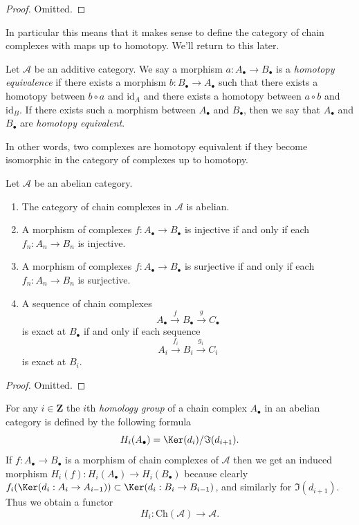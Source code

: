\begin{proof}
Omitted.
\end{proof}

\noindent
In particular this means that it makes sense to define
the category of chain complexes with maps up to homotopy.
We'll return to this later.

\begin{definition}
\label{definition-homotopy-equivalent}
Let $\mathcal{A}$ be an additive category.
We say a morphism $a : A_\bullet \to B_\bullet$
is a {\it homotopy equivalence} if there exists
a morphism $b : B_\bullet \to A_\bullet$
such that there exists a homotopy between
$b \circ a$ and $\text{id}_A$
and there exists a homotopy between $a \circ b$ and $\text{id}_B$.
If there exists such a morphism between $A_\bullet$ and $B_\bullet$, then
we say that $A_\bullet$ and $B_\bullet$ are {\it homotopy equivalent}.
\end{definition}

\noindent
In other words, two complexes are homotopy equivalent if they become
isomorphic in the category of complexes up to homotopy.

\begin{lemma}
\label{lemma-cat-chain-abelian}
Let $\mathcal{A}$ be an abelian category.
\begin{enumerate}
\item The category of chain complexes in $\mathcal{A}$ is
abelian.
\item A morphism of complexes
$f : A_\bullet \to B_\bullet$ is injective
if and only if each $f_n : A_n \to B_n$ is injective.
\item A morphism of complexes
$f : A_\bullet \to B_\bullet$ is surjective
if and only if each $f_n : A_n \to B_n$ is surjective.
\item A sequence of chain complexes
$$
A_\bullet \xrightarrow{f} B_\bullet \xrightarrow{g} C_\bullet
$$
is exact at $B_\bullet$ if and only if each sequence
$$
A_i \xrightarrow{f_i} B_i \xrightarrow{g_i} C_i
$$
is exact at $B_i$.
\end{enumerate}
\end{lemma}

\begin{proof}
Omitted.
\end{proof}

\noindent
For any $i \in \mathbf{Z}$ the $i$th {\it homology group}
of a chain complex $A_\bullet$ in an abelian category is defined by
the following formula
$$
H_i(A_\bullet) = \Ker(d_i)/\Im(d_{i + 1}).
$$
If $f : A_\bullet \to B_\bullet$ is a morphism of chain
complexes of $\mathcal{A}$ then we get an induced
morphism $H_i(f) : H_i(A_\bullet) \to H_i(B_\bullet)$
because clearly
$f_i(\Ker(d_i : A_i \to A_{i - 1})) \subset
\Ker(d_i : B_i \to B_{i - 1})$, and similarly
for $\Im(d_{i + 1})$.
Thus we obtain a functor
$$
H_i : \text{Ch}(\mathcal{A}) \longrightarrow \mathcal{A}.
$$

